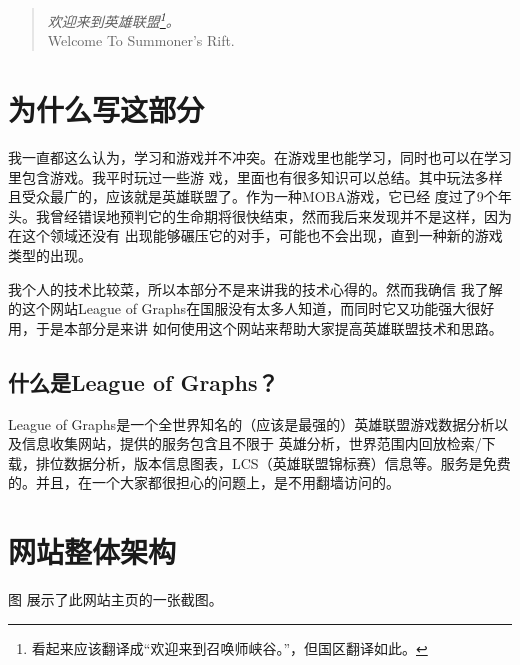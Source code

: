 \newcommand{\mLoG}{League of Graphs}

\begin{quote}
{\em 欢迎来到英雄联盟\footnote{看起来应该翻译成``欢迎来到召唤师峡谷。''，但国区翻译如此。}。} \\
{\ttfamily Welcome To Summoner's Rift.}
\end{quote}

\section{为什么写这部分}
我一直都这么认为，学习和游戏并不冲突。在游戏里也能学习，同时也可以在学习里包含游戏。我平时玩过一些游
戏，里面也有很多知识可以总结。其中玩法多样且受众最广的，应该就是英雄联盟了。作为一种MOBA游戏，它已经
度过了9个年头。我曾经错误地预判它的生命期将很快结束，然而我后来发现并不是这样，因为在这个领域还没有
出现能够碾压它的对手，可能也不会出现，直到一种新的游戏类型的出现。

我个人的技术比较菜，所以本部分不是来讲我的技术心得的。然而我确信
我了解的这个网站\mLoG 在国服没有太多人知道，而同时它又功能强大很好用，于是本部分是来讲
如何使用这个网站来帮助大家提高英雄联盟技术和思路。

\subsection{什么是\mLoG ？}
\mLoG 是一个全世界知名的（应该是最强的）英雄联盟游戏数据分析以及信息收集网站，提供的服务包含且不限于
英雄分析，世界范围内回放检索/下载，排位数据分析，版本信息图表，LCS（英雄联盟锦标赛）信息等。服务是免费
的。并且，在一个大家都很担心的问题上，是不用翻墙访问的。

\section{网站整体架构}
图 展示了此网站主页的一张截图。